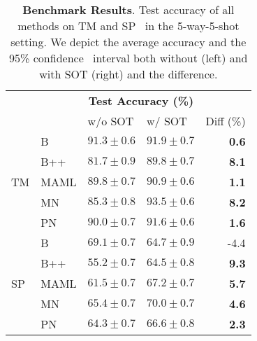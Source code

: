 \begin{table}[h]
\caption{\textbf{Benchmark Results}. Test accuracy of all methods on TM and SP     \ in the 5-way-5-shot setting. We depict the average accuracy and the 95\% confidence      \ interval both without (left) and with SOT (right) and the difference.}
\label{tab:tuned-benchmark}
\vspace{3.5pt}
\centering
\begin{tabular}{llllr}
\toprule
& & \multicolumn{2}{c}{\textbf{Test Accuracy (\%)}} &  \\
 &  & w/o SOT & w/ SOT & Diff (\%) \\
\midrule
\multirow[c]{5}{*}{TM} & B & $\mathbf{91.3 \pm 0.6}$ & $91.9 \pm 0.7$ & \bfseries \color{teal} 0.6 \\
 & B++ & $81.7 \pm 0.9$ & $89.8 \pm 0.7$ & \bfseries \color{teal} 8.1 \\
 & MAML & $89.8 \pm 0.7$ & $90.9 \pm 0.6$ & \bfseries \color{teal} 1.1 \\
 & MN & $85.3 \pm 0.8$ & $\mathbf{93.5 \pm 0.6}$ & \bfseries \color{teal} 8.2 \\
 & PN & $90.0 \pm 0.7$ & $91.6 \pm 0.6$ & \bfseries \color{teal} 1.6 \\
\midrule
\multirow[c]{5}{*}{SP} & B & $\mathbf{69.1 \pm 0.7}$ & $64.7 \pm 0.9$ & \color{red} -4.4 \\
 & B++ & $55.2 \pm 0.7$ & $64.5 \pm 0.8$ & \bfseries \color{teal} 9.3 \\
 & MAML & $61.5 \pm 0.7$ & $67.2 \pm 0.7$ & \bfseries \color{teal} 5.7 \\
 & MN & $65.4 \pm 0.7$ & $\mathbf{70.0 \pm 0.7}$ & \bfseries \color{teal} 4.6 \\
 & PN & $64.3 \pm 0.7$ & $66.6 \pm 0.8$ & \bfseries \color{teal} 2.3 \\
\bottomrule
\end{tabular}
\end{table}